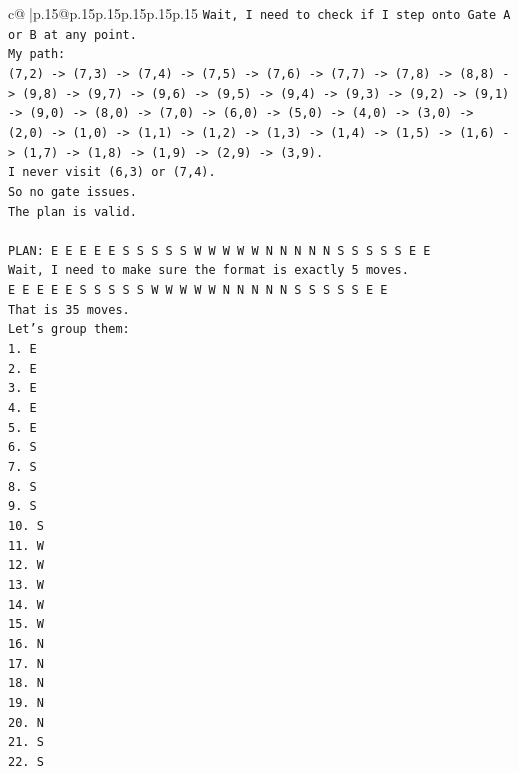\documentclass{article}
\begin{document}
{\begin{supertabular}{c@{$\;$}|p{.15\linewidth}@{}p{.15\linewidth}p{.15\linewidth}p{.15\linewidth}p{.15\linewidth}p{.15\linewidth}}
{{{\texttt{Wait, I need to check if I step onto Gate A or B at any point.} \\
\texttt{My path:} \\
\texttt{(7,2) {-}> (7,3) {-}> (7,4) {-}> (7,5) {-}> (7,6) {-}> (7,7) {-}> (7,8) {-}> (8,8) {-}> (9,8) {-}> (9,7) {-}> (9,6) {-}> (9,5) {-}> (9,4) {-}> (9,3) {-}> (9,2) {-}> (9,1) {-}> (9,0) {-}> (8,0) {-}> (7,0) {-}> (6,0) {-}> (5,0) {-}> (4,0) {-}> (3,0) {-}> (2,0) {-}> (1,0) {-}> (1,1) {-}> (1,2) {-}> (1,3) {-}> (1,4) {-}> (1,5) {-}> (1,6) {-}> (1,7) {-}> (1,8) {-}> (1,9) {-}> (2,9) {-}> (3,9).} \\
\texttt{I never visit (6,3) or (7,4).} \\
\texttt{So no gate issues.} \\
\texttt{The plan is valid.} \\
\\ 
\texttt{PLAN: E E E E E S S S S S W W W W W N N N N N S S S S S E E} \\
\texttt{Wait, I need to make sure the format is exactly 5 moves.} \\
\texttt{E E E E E S S S S S W W W W W N N N N N S S S S S E E} \\
\texttt{That is 35 moves.} \\
\texttt{Let's group them:} \\
\texttt{1. E} \\
\texttt{2. E} \\
\texttt{3. E} \\
\texttt{4. E} \\
\texttt{5. E} \\
\texttt{6. S} \\
\texttt{7. S} \\
\texttt{8. S} \\
\texttt{9. S} \\
\texttt{10. S} \\
\texttt{11. W} \\
\texttt{12. W} \\
\texttt{13. W} \\
\texttt{14. W} \\
\texttt{15. W} \\
\texttt{16. N} \\
\texttt{17. N} \\
\texttt{18. N} \\
\texttt{19. N} \\
\texttt{20. N} \\
\texttt{21. S} \\
\texttt{22. S} \\
}}}
\end{supertabular}}
\end{document}
